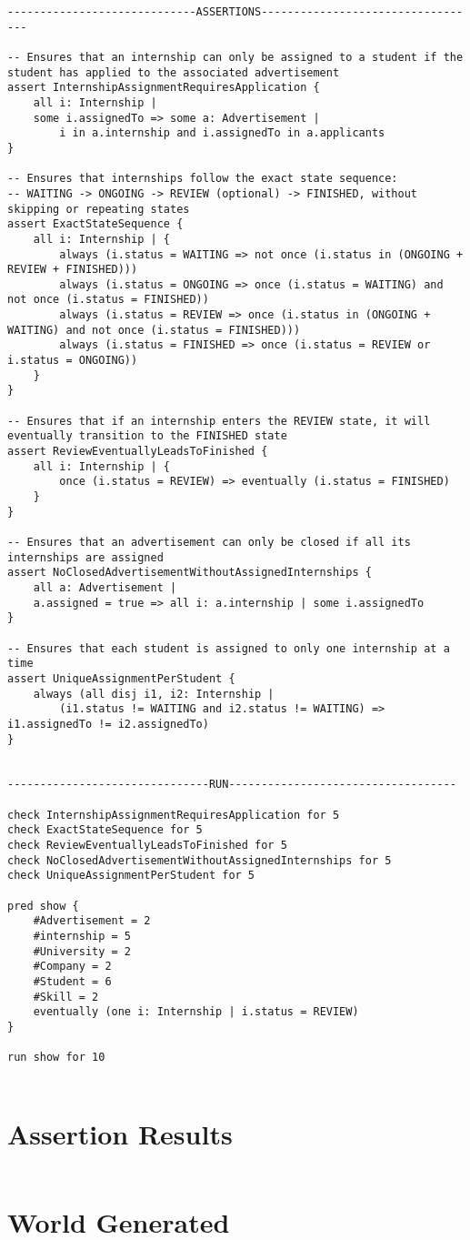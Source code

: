 \begin{lstlisting}
-----------------------------ASSERTIONS----------------------------------

-- Ensures that an internship can only be assigned to a student if the student has applied to the associated advertisement
assert InternshipAssignmentRequiresApplication {
    all i: Internship | 
    some i.assignedTo => some a: Advertisement | 
        i in a.internship and i.assignedTo in a.applicants
}

-- Ensures that internships follow the exact state sequence:
-- WAITING -> ONGOING -> REVIEW (optional) -> FINISHED, without skipping or repeating states
assert ExactStateSequence {
    all i: Internship | {
        always (i.status = WAITING => not once (i.status in (ONGOING + REVIEW + FINISHED)))
        always (i.status = ONGOING => once (i.status = WAITING) and not once (i.status = FINISHED))
        always (i.status = REVIEW => once (i.status in (ONGOING + WAITING) and not once (i.status = FINISHED)))
        always (i.status = FINISHED => once (i.status = REVIEW or i.status = ONGOING))
    }
}

-- Ensures that if an internship enters the REVIEW state, it will eventually transition to the FINISHED state
assert ReviewEventuallyLeadsToFinished {
    all i: Internship | {
        once (i.status = REVIEW) => eventually (i.status = FINISHED)
    }
}

-- Ensures that an advertisement can only be closed if all its internships are assigned
assert NoClosedAdvertisementWithoutAssignedInternships {
    all a: Advertisement | 
    a.assigned = true => all i: a.internship | some i.assignedTo
}

-- Ensures that each student is assigned to only one internship at a time
assert UniqueAssignmentPerStudent {
    always (all disj i1, i2: Internship | 
        (i1.status != WAITING and i2.status != WAITING) => i1.assignedTo != i2.assignedTo)
}


-------------------------------RUN-----------------------------------

check InternshipAssignmentRequiresApplication for 5
check ExactStateSequence for 5
check ReviewEventuallyLeadsToFinished for 5
check NoClosedAdvertisementWithoutAssignedInternships for 5
check UniqueAssignmentPerStudent for 5

pred show {
    #Advertisement = 2
    #internship = 5
    #University = 2
    #Company = 2
    #Student = 6
    #Skill = 2
    eventually (one i: Internship | i.status = REVIEW)
}

run show for 10


\end{lstlisting}


\section{Assertion Results}

\begin{lstlisting}

\end{lstlisting}

\section{World Generated}
    
\begin{lstlisting}

\end{lstlisting}